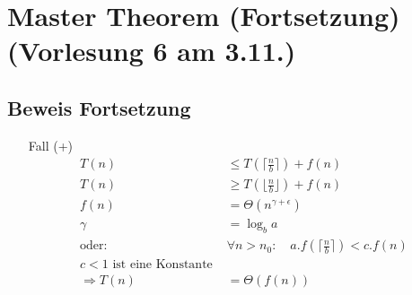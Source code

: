 \section{Master Theorem (Fortsetzung) \tiny (Vorlesung 6 am 3.11.)}
\subsection{Beweis Fortsetzung}
\begin{enumerate}
\item[Fall (+)]
\begin{align*}
T(n) & \leq T(\lceil \frac{n}{b} \rceil)+f(n)\\
T(n) &\geq T(\lfloor \frac{n}{b} \rfloor)+f(n)\\
f(n) &= \Theta(n^{\gamma + \epsilon})\\
\gamma &= \log_b a\\
\text{oder: } & \forall n > n_0: \quad a.f(\lceil \frac{n}{b} \rceil) < c.f(n)\\
c<1 \text{ ist eine Konstante }\\
\Rightarrow T(n) &= \Theta(f(n))\\
\end{align*}
\end{enumerate}

